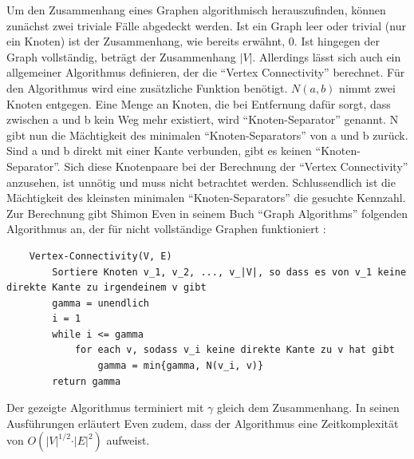 \documentclass[a4paper,12pt,ngerman,chapterprefix=false,listof=totoc,bibliography=totoc]{scrreprt}
\begin{document}
{Um den Zusammenhang eines Graphen algorithmisch herauszufinden, können zunächst zwei triviale Fälle abgedeckt werden. Ist ein Graph leer oder trivial (nur ein Knoten) ist der Zusammenhang, wie bereits erwähnt, 0. Ist hingegen der Graph vollständig, beträgt der Zusammenhang \(\vert V\vert\). Allerdings lässt sich auch ein allgemeiner Algorithmus definieren, der die "`Vertex Connectivity"' berechnet.  Für den Algorithmus wird eine zusätzliche Funktion benötigt. \(N(a,b)\) nimmt zwei Knoten entgegen. Eine Menge an Knoten, die bei Entfernung dafür sorgt, dass zwischen a und b kein Weg mehr existiert, wird "`Knoten-Separator"' genannt. N gibt nun die Mächtigkeit des minimalen "`Knoten-Separators"' von a und b zurück. Sind a und b direkt mit einer Kante verbunden, gibt es keinen "`Knoten-Separator"'. Sich diese Knotenpaare bei der Berechnung der "`Vertex Connectivity"' anzusehen, ist unnötig und muss nicht betrachtet werden. Schlussendlich ist die Mächtigkeit des kleinsten minimalen "`Knoten-Separators"' die gesuchte Kennzahl. Zur Berechnung gibt Shimon Even in seinem Buch "`Graph Algorithms"' folgenden Algorithmus an, der für nicht vollständige Graphen funktioniert \cite{even_graph_2012}:
\begin{lstlisting}
	Vertex-Connectivity(V, E)
		Sortiere Knoten v_1, v_2, ..., v_|V|, so dass es von v_1 keine direkte Kante zu irgendeinem v gibt
		gamma = unendlich
		i = 1
		while i <= gamma
			for each v, sodass v_i keine direkte Kante zu v hat gibt
				gamma = min{gamma, N(v_i, v)}
		return gamma
\end{lstlisting}
Der gezeigte Algorithmus terminiert mit \(\gamma\) gleich dem Zusammenhang. In seinen Ausführungen erläutert Even zudem, dass der Algorithmus eine Zeitkomplexität von \(O(\vert V\vert^{1/2} \cdot \vert E\vert^2)\) aufweist.
}
\end{document}
